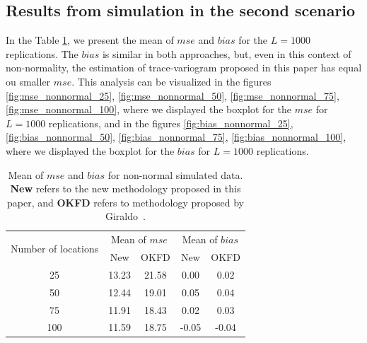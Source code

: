 \documentclass[12pt]{interact}
\theoremstyle{plain}%
\theoremstyle{definition}
\theoremstyle{remark}
\begin{document}
\subsection*{Results from simulation in the second scenario}\label{results-from-simulation-in-the-second-scenario}

In the Table \ref{tab:summary-nonnormal}, we present the mean of \(mse\) and \(bias\) for the \(L=1000\) replications. The \(bias\) is similar in both approaches, but, even in this context of non-normality, the estimation of trace-variogram proposed in this paper has equal ou smaller \(mse\).
This analysis can be visualized in the figures \ref{fig:mse_nonnormal_25}, \ref{fig:mse_nonnormal_50}, \ref{fig:mse_nonnormal_75}, \ref{fig:mse_nonnormal_100}, where we displayed the boxplot for the \(mse\) for \(L=1000\) replications, and in the figures \ref{fig:bias_nonnormal_25}, \ref{fig:bias_nonnormal_50}, \ref{fig:bias_nonnormal_75}, \ref{fig:bias_nonnormal_100}, where we displayed the boxplot for the \(bias\) for \(L=1000\) replications.

\begin{table}[p]
	\centering
	\caption{Mean of $mse$ and $bias$ for non-normal simulated data. \textbf{New} refers to the new methodology proposed in this paper, and \textbf{OKFD} refers to methodology proposed by Giraldo~\cite{giraldo2011ordinary}.}
	\begin{tabular}{ccc|cc}
		\toprule
		\multirow{2}{*}{Number of locations} & \multicolumn{2}{c}{Mean of $mse$} & \multicolumn{2}{|c}{Mean of $bias$} \\ \cmidrule{2-5}
		& New   & OKFD  & New   & OKFD \\  \midrule
		25    & 13.23 & 21.58 & 0.00  & 0.02 \\
		50    & 12.44 & 19.01 & 0.05  & 0.04 \\
		75    & 11.91 & 18.43 & 0.02  & 0.03 \\
		100   & 11.59 & 18.75 & -0.05 & -0.04 \\ \bottomrule
	\end{tabular}
	\label{tab:summary-nonnormal}
\end{table}
\end{document}

